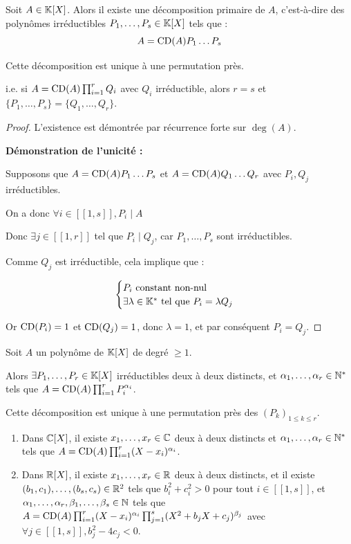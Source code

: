 \documentclass[12pt, a4paper]{report}
\begin{document}
\begin{theorem}
    Soit $A \in \mathbb{K}[X]$. Alors il existe une décomposition primaire de $A$, c'est-à-dire des polynômes irréductibles $P_1, \dots, P_s \in \mathbb{K}[X]$ tels que :
    $$A = \mathrm{CD}(A) P_1 \dots P_s$$

    Cette décomposition est unique à une permutation près.

    i.e. si $A = \mathrm{CD}(A) \prod_{i=1}^r Q_i$ avec $Q_i$ irréductible, alors $r=s$ et $\{P_1,\dots,P_s\} = \{Q_1,\dots,Q_r\}$.
\end{theorem}

\begin{proof}
    L'existence est démontrée par récurrence forte sur $\deg(A)$.

    \textbf{Démonstration de l'unicité :}

    Supposons que $A = \mathrm{CD}(A) P_1 \dots P_s$ et $A = \mathrm{CD}(A) Q_1 \dots Q_r$ avec $P_i, Q_j$ irréductibles.

    On a donc $\forall i \in [\![1,s]\!], P_i \mid A$

    Donc $\exists j \in [\![1,r]\!]$ tel que $P_i \mid Q_j$, car $P_1, \dots, P_s$ sont irréductibles.

    Comme $Q_j$ est irréductible, cela implique que :

    $$\begin{cases}
        P_i \text{ constant non-nul }\\
        \exists \lambda \in \mathbb{K}^* \text{ tel que } P_i = \lambda Q_j
    \end{cases}$$

    Or $\mathrm{CD}(P_i) = 1$ et $\mathrm{CD}(Q_j) = 1$, donc $\lambda = 1$, et par conséquent $P_i = Q_j$.
\end{proof}

\begin{consequence}
    Soit $A$ un polynôme de $\mathbb{K}[X]$ de degré $\ge 1$.

    Alors $\exists P_1,\dots,P_r \in \mathbb{K}[X]$ irréductibles deux à deux distincts, et $\alpha_1,\dots,\alpha_r \in \mathbb{N}^*$ tels que $A = \mathrm{CD}(A) \prod_{i=1}^{r} P_i^{\alpha_i}$.

    Cette décomposition est unique à une permutation près des $(P_k)_{1 \le k \le r}$.
\end{consequence}

\begin{remark}
    \begin{enumerate}
        \item Dans $\mathbb{C}[X]$, il existe $x_1,\dots,x_r \in \mathbb{C}$ deux à deux distincts et $\alpha_1,\dots,\alpha_r \in \mathbb{N}^*$ tels que $A = \mathrm{CD}(A) \prod_{i=1}^{r} (X-x_i)^{\alpha_i}$.
        \item Dans $\mathbb{R}[X]$, il existe $x_1,\dots,x_r \in \mathbb{R}$ deux à deux distincts, et il existe $(b_1,c_1),\dots,(b_s,c_s) \in \mathbb{R}^2$ tels que $b_i^2 + c_i^2 > 0$ pour tout $i \in [\![1,s]\!]$, et $\alpha_1,\dots,\alpha_r, \beta_1,\dots,\beta_s \in \mathbb{N}$ tels que $A = \mathrm{CD}(A) \prod_{i=1}^{r} (X-x_i)^{\alpha_i} \prod_{j=1}^{s} (X^2 + b_j X + c_j)^{\beta_j}$ avec $\forall j \in [\![1,s]\!], b_j^2 - 4c_j < 0$.
    \end{enumerate}
\end{remark}
\end{document}
